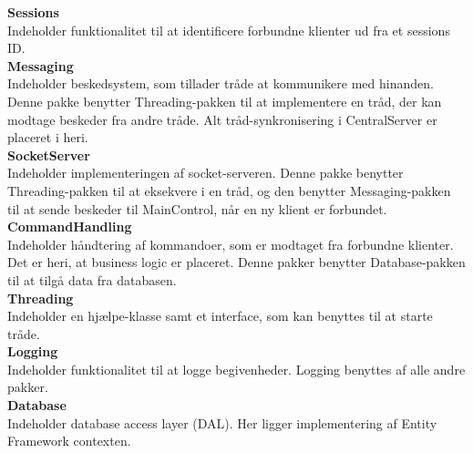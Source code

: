 \textbf{Sessions}\\
Indeholder funktionalitet til at identificere forbundne klienter ud fra et sessions ID.\\

\textbf{Messaging}\\
Indeholder beskedsystem, som tillader tråde at kommunikere med hinanden. Denne pakke benytter Threading-pakken til at implementere en tråd, der kan modtage beskeder fra andre tråde. Alt tråd-synkronisering i CentralServer er placeret i heri.\\

\textbf{SocketServer}\\
Indeholder implementeringen af socket-serveren. Denne pakke benytter Threading-pakken til at eksekvere i en tråd, og den benytter Messaging-pakken til at sende beskeder til MainControl, når en ny klient er forbundet.\\

\textbf{CommandHandling}\\
Indeholder håndtering af kommandoer, som er modtaget fra forbundne klienter. Det er heri, at business logic er placeret. Denne pakker benytter Database-pakken til at tilgå data fra databasen.\\

\textbf{Threading}\\
Indeholder en hjælpe-klasse samt et interface, som kan benyttes til at starte tråde.\\

\textbf{Logging}\\
Indeholder funktionalitet til at logge begivenheder. Logging benyttes af alle andre pakker.\\

\textbf{Database}\\
Indeholder database access layer (DAL). Her ligger implementering af Entity Framework contexten.